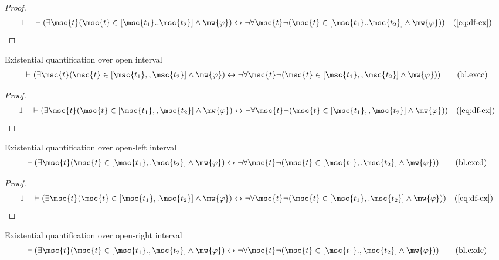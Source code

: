 \begin{proof}
\begin{align}
  1 &&  & \vdash ( \exists \msc{t} ( \msc{t} \in [ \msc{t_1} .. \msc{t_2} ] \wedge \mw{\varphi} ) \leftrightarrow \lnot \forall \msc{t} \lnot ( \msc{t} \in [ \msc{t_1} .. \msc{t_2} ] \wedge \mw{\varphi} ) )&(\mbox{\ref{eq:df-ex}})\notag
\end{align}
\end{proof}

\begin{lemma} Existential quantification over open
interval
\begin{align}
\vdash ( \exists \msc{t} ( \msc{t} \in [ \msc{t_1} ,, \msc{t_2} ] \wedge
    \mw{\varphi} ) \leftrightarrow \lnot \forall \msc{t} \lnot ( \msc{t} \in [
    \msc{t_1} ,, \msc{t_2} ] \wedge \mw{\varphi} )
    )\label{eq:bl.excc}\tag{bl.excc}
\end{align}
\end{lemma}

\begin{proof}
\begin{align}
  1 &&  & \vdash ( \exists \msc{t} ( \msc{t} \in [ \msc{t_1} ,, \msc{t_2} ] \wedge \mw{\varphi} ) \leftrightarrow \lnot \forall \msc{t} \lnot ( \msc{t} \in [ \msc{t_1} ,, \msc{t_2} ] \wedge \mw{\varphi} ) )&(\mbox{\ref{eq:df-ex}})\notag
\end{align}
\end{proof}

\begin{lemma} Existential quantification over open-left
interval
\begin{align}
\vdash ( \exists \msc{t} ( \msc{t} \in [ \msc{t_1} ,. \msc{t_2} ] \wedge
    \mw{\varphi} ) \leftrightarrow \lnot \forall \msc{t} \lnot ( \msc{t} \in [
    \msc{t_1} ,. \msc{t_2} ] \wedge \mw{\varphi} )
    )\label{eq:bl.excd}\tag{bl.excd}
\end{align}
\end{lemma}

\begin{proof}
\begin{align}
  1 &&  & \vdash ( \exists \msc{t} ( \msc{t} \in [ \msc{t_1} ,. \msc{t_2} ] \wedge \mw{\varphi} ) \leftrightarrow \lnot \forall \msc{t} \lnot ( \msc{t} \in [ \msc{t_1} ,. \msc{t_2} ] \wedge \mw{\varphi} ) )&(\mbox{\ref{eq:df-ex}})\notag
\end{align}
\end{proof}

\begin{lemma} Existential quantification over open-right
interval
\begin{align}
\vdash ( \exists \msc{t} ( \msc{t} \in [ \msc{t_1} ., \msc{t_2} ] \wedge
    \mw{\varphi} ) \leftrightarrow \lnot \forall \msc{t} \lnot ( \msc{t} \in [
    \msc{t_1} ., \msc{t_2} ] \wedge \mw{\varphi} )
    )\label{eq:bl.exdc}\tag{bl.exdc}
\end{align}
\end{lemma}

